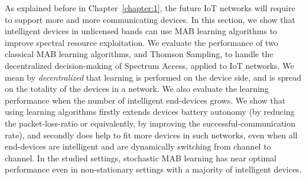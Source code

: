 
\graphicspath{{2-Chapters/4-Chapter/CrownCom_17.git/}}

As explained before in Chapter~\ref{chapter:1}, the future IoT networks will require to support more and more communicating devices.
In this section, we show that intelligent devices in unlicensed bands can use MAB learning algorithms to improve spectral resource exploitation.
%
We evaluate the performance of two classical MAB learning algorithms, \UCB{} and Thomson Sampling, to handle the decentralized decision-making of Spectrum Access, applied to IoT networks.
We mean by \emph{decentralized} that learning is performed on the device side, and is spread on the totality of the devices in a network.
We also evaluate the learning performance when the number of intelligent end-devices grows.
%
We show that using learning algorithms
firstly extends devices battery autonomy (by reducing the packet-loss-ratio or equivalently, by improving the successful-communication rate),
and secondly does help to fit more devices in such networks, even when all end-devices are intelligent and are dynamically switching from channel to channel.
In the studied settings, stochastic MAB learning
has near optimal performance even in non-stationary settings with a majority of intelligent devices.



